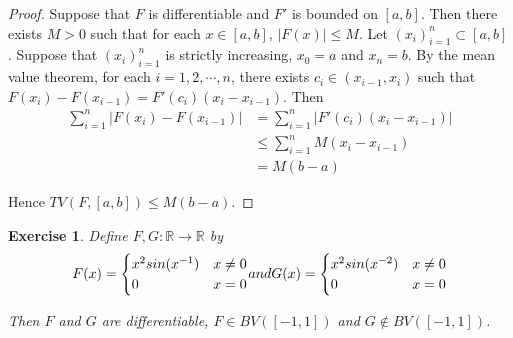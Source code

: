 \documentclass[12pt]{amsart}
\newtheorem{ex}[thm]{Exercise}
\newcommand{\R}{\mathbb{R}}
\begin{document}
\begin{proof}
Suppose that $F$ is differentiable and $F'$ is bounded on $[a,b]$. Then there exists $M>0$ such that for each $x \in [a,b]$, $|F(x)| \leq M$. Let $(x_i)_{i=1}^n \subset [a,b]$. Suppose that $(x_i)_{i=1}^n$ is strictly increasing, $x_0=a$ and $x_n=b$. By the mean value theorem, for each $i =1,2, \cdots, n$, there exists $c_i\in (x_{i-1}, x_i)$ such that $F(x_i)-F(x_{i-1})=F'(c_i)(x_i-x_{i-1})$. Then 
\begin{align*}
\sum_{i=1}^n|F(x_i)-F(x_{i-1})|
&= \sum_{i=1}^n|F'(c_i)(x_i-x_{i-1})|\\
&\leq  \sum_{i=1}^nM(x_i-x_{i-1})\\
&=M(b-a)
\end{align*}

Hence $TV(F, [a,b]) \leq M(b-a)$.
\end{proof}

\begin{ex}
Define $F,G:\R \rightarrow \R$ by 
\[ F(x) = \begin{cases}
x^2sin(x^{-1}) & x \neq 0\\
0 & x=0\\
\end{cases}$$ and $$G(x)=
\begin{cases}
x^2sin(x^{-2}) & x \neq 0\\
0 & x=0
\end{cases}
\]

Then $F$ and $G$ are differentiable, $F \in BV([-1,1])$ and $G \not \in BV([-1,1])$.
\end{ex}
\end{document}
